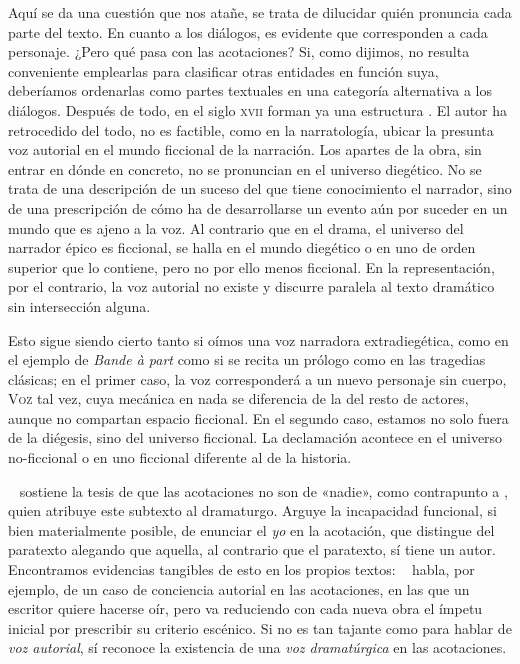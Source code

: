Aquí se da una cuestión que nos atañe, se trata de dilucidar quién pronuncia cada parte del texto. En cuanto a los diálogos, es evidente que corresponden a cada personaje. ¿Pero qué pasa con las acotaciones? Si, como dijimos, no resulta conveniente emplearlas para clasificar otras entidades en función suya, deberíamos ordenarlas como partes textuales en una categoría alternativa a los diálogos. Después de todo, en el siglo \textsc{xvii} forman ya una estructura \parencite[562]{monzo2020}. El autor ha retrocedido del todo, no es factible, como en la narratología, ubicar la presunta voz autorial en el mundo ficcional de la narración. Los apartes de la obra, sin entrar en dónde en concreto, no se pronuncian en el universo diegético. No se trata de una descripción de un suceso del que tiene conocimiento el narrador, sino de una prescripción de cómo ha de desarrollarse un evento aún por suceder en un mundo que es ajeno a la voz. Al contrario que en el drama, el universo del narrador épico es ficcional, se halla en  el mundo diegético o en uno de orden superior que lo contiene, pero no por ello menos ficcional. En la representación, por el contrario, la voz autorial no existe y discurre paralela al texto dramático sin intersección alguna.

Esto sigue siendo cierto tanto si oímos una voz narradora extradiegética, como en el ejemplo de \textit{Bande à part} como si se recita un prólogo como en las tragedias clásicas; en el primer caso, la voz corresponderá a un nuevo personaje sin cuerpo, \textsc{Voz} tal vez, cuya mecánica en nada se diferencia de la del resto de actores, aunque no compartan espacio ficcional. En el segundo caso, estamos no solo fuera de la diégesis, sino del universo ficcional. La declamación acontece en el universo no-ficcional o en uno ficcional diferente al de la historia.

\citeauthor{garcia2020}~\parencite*[49]{garcia2020} sostiene la tesis de que las acotaciones no son de «nadie», como contrapunto a \citeauthor{ubersfeld1996} \parencite*[18]{ubersfeld1996}, quien atribuye este subtexto al dramaturgo. Arguye la incapacidad funcional, si bien materialmente posible, de enunciar el \textit{yo} en la acotación, que distingue del paratexto alegando que aquella, al contrario que el paratexto, sí tiene un autor. Encontramos evidencias tangibles de esto en los propios textos: \citeauthor{monzo2021}~\parencite*[93-94]{monzo2021} habla, por ejemplo, de un caso de conciencia autorial en las acotaciones, en las que un escritor quiere hacerse oír, pero va reduciendo con cada nueva obra el ímpetu inicial por prescribir su criterio escénico. Si no es tan tajante como para hablar de \textit{voz autorial}, sí reconoce la existencia de una \textit{voz dramatúrgica} en las acotaciones.


